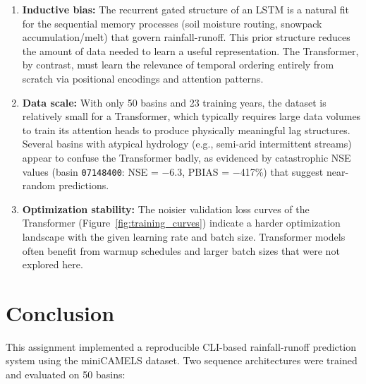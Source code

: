 \documentclass[11pt, letterpaper]{article}
\begin{document}
\begin{enumerate}
    \item \textbf{Inductive bias:} The recurrent gated structure of an LSTM
          is a natural fit for the sequential memory processes (soil moisture
          routing, snowpack accumulation/melt) that govern rainfall-runoff.
          This prior structure reduces the amount of data needed to learn a
          useful representation.  The Transformer, by contrast, must learn
          the relevance of temporal ordering entirely from scratch via
          positional encodings and attention patterns.

    \item \textbf{Data scale:} With only 50 basins and 23 training years,
          the dataset is relatively small for a Transformer, which typically
          requires large data volumes to train its attention heads to produce
          physically meaningful lag structures.  Several basins with atypical
          hydrology (e.g., semi-arid intermittent streams) appear to confuse
          the Transformer badly, as evidenced by catastrophic NSE values
          (basin \texttt{07148400}: NSE = $-$6.3, PBIAS = $-$417\%) that
          suggest near-random predictions.

    \item \textbf{Optimization stability:} The noisier validation loss
          curves of the Transformer (Figure~\ref{fig:training_curves}) indicate
          a harder optimization landscape with the given learning rate and
          batch size.  Transformer models often benefit from warmup schedules
          and larger batch sizes that were not explored here.
\end{enumerate}

\section{Conclusion}

This assignment implemented a reproducible CLI-based rainfall-runoff
prediction system using the miniCAMELS dataset.  Two sequence architectures
were trained and evaluated on 50 basins:
\end{document}
